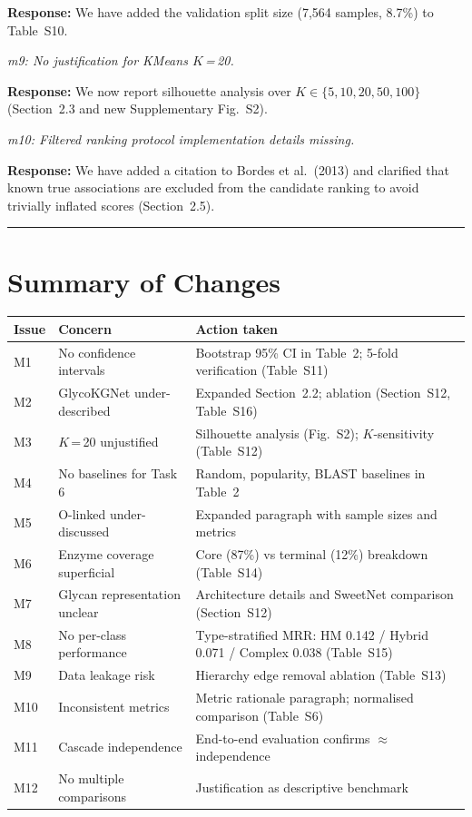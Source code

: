 \documentclass[11pt,a4paper]{article}
\newcommand{\reviewercomment}[1]{\textit{\color{black!70}#1}}
\newcommand{\response}[1]{\textbf{Response:} #1}
\begin{document}
\response{We have added the validation split size (7,564 samples, 8.7\%) to
Table~S10.}

\reviewercomment{m9: No justification for KMeans $K$\,=\,20.}

\response{We now report silhouette analysis over
$K \in \{5, 10, 20, 50, 100\}$ (Section~2.3 and new Supplementary Fig.~S2).}

\reviewercomment{m10: Filtered ranking protocol implementation details missing.}

\response{We have added a citation to Bordes et al.\ (2013) and clarified that
known true associations are excluded from the candidate ranking to avoid
trivially inflated scores (Section~2.5).}

\vspace{1em}
\noindent\rule{\linewidth}{0.8pt}

\section*{Summary of Changes}

\begin{center}
\small
\begin{tabular}{p{1.5cm}p{5cm}p{6cm}}
\hline
\textbf{Issue} & \textbf{Concern} & \textbf{Action taken} \\
\hline
M1 & No confidence intervals & Bootstrap 95\% CI in Table~2; 5-fold verification (Table~S11) \\
M2 & GlycoKGNet under-described & Expanded Section~2.2; ablation (Section~S12, Table~S16) \\
M3 & $K$\,=\,20 unjustified & Silhouette analysis (Fig.~S2); $K$-sensitivity (Table~S12) \\
M4 & No baselines for Task 6 & Random, popularity, BLAST baselines in Table~2 \\
M5 & O-linked under-discussed & Expanded paragraph with sample sizes and metrics \\
M6 & Enzyme coverage superficial & Core (87\%) vs terminal (12\%) breakdown (Table~S14) \\
M7 & Glycan representation unclear & Architecture details and SweetNet comparison (Section~S12) \\
M8 & No per-class performance & Type-stratified MRR: HM 0.142 / Hybrid 0.071 / Complex 0.038 (Table~S15) \\
M9 & Data leakage risk & Hierarchy edge removal ablation (Table~S13) \\
M10 & Inconsistent metrics & Metric rationale paragraph; normalised comparison (Table~S6) \\
M11 & Cascade independence & End-to-end evaluation confirms $\approx$ independence \\
M12 & No multiple comparisons & Justification as descriptive benchmark \\
\hline
\end{tabular}
\end{center}
\end{document}
